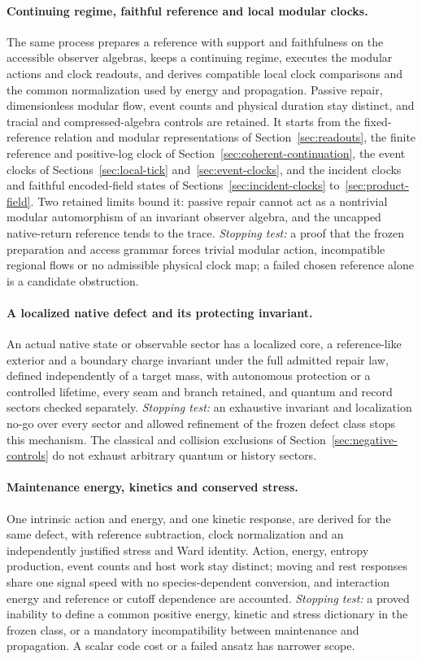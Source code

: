 \documentclass[11pt]{article}
\theoremstyle{definition}
\theoremstyle{remark}
\theoremstyle{plain}
\begin{document}
\paragraph{Continuing regime, faithful reference and local modular clocks.}
The same process prepares a reference with support and faithfulness on the
accessible observer algebras, keeps a continuing regime, executes the
modular actions and clock readouts, and derives compatible local clock
comparisons and the common normalization used by energy and propagation.
Passive repair, dimensionless modular flow, event counts and physical
duration stay distinct, and tracial and compressed-algebra controls are
retained. It starts from the fixed-reference relation and modular
representations of Section~\ref{sec:readouts}, the finite reference and
positive-log clock of Section~\ref{sec:coherent-continuation}, the event
clocks of Sections~\ref{sec:local-tick} and~\ref{sec:event-clocks}, and the
incident clocks and faithful encoded-field states of
Sections~\ref{sec:incident-clocks} to~\ref{sec:product-field}. Two retained
limits bound it: passive repair cannot act as a nontrivial modular
automorphism of an invariant observer algebra, and the uncapped native-return
reference tends to the trace. \emph{Stopping test:} a proof that the frozen
preparation and access grammar forces trivial modular action, incompatible
regional flows or no admissible physical clock map; a failed chosen reference
alone is a candidate obstruction.

\paragraph{A localized native defect and its protecting invariant.} An actual
native state or observable sector has a localized core, a reference-like
exterior and a boundary charge invariant under the full admitted repair law,
defined independently of a target mass, with autonomous protection or a
controlled lifetime, every seam and branch retained, and quantum and record
sectors checked separately. \emph{Stopping test:} an exhaustive invariant and
localization no-go over every sector and allowed refinement of the frozen
defect class stops this mechanism. The classical and collision exclusions of
Section~\ref{sec:negative-controls} do not exhaust arbitrary quantum or
history sectors.

\paragraph{Maintenance energy, kinetics and conserved stress.} One intrinsic
action and energy, and one kinetic response, are derived for the same
defect, with reference subtraction, clock normalization and an independently
justified stress and Ward identity. Action, energy, entropy production, event
counts and host work stay distinct; moving and rest responses share one
signal speed with no species-dependent conversion, and interaction energy and
reference or cutoff dependence are accounted. \emph{Stopping test:} a proved
inability to define a common positive energy, kinetic and stress dictionary
in the frozen class, or a mandatory incompatibility between maintenance and
propagation. A scalar code cost or a failed ansatz has narrower scope.
\end{document}
